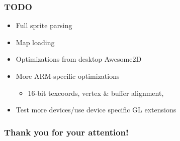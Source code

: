\documentclass[ignorenonframetext]{beamer}
\begin{document}
\begin{frame}[fragile]
\frametitle{TODO}

\begin{itemize}

\item Full sprite parsing

\item Map loading

\item Optimizations from desktop Awesome2D

\item More ARM-specific optimizations
\begin{itemize}

\item 16-bit texcoords, vertex \& buffer alignment,
\end{itemize}

\item Test more devices/use device specific GL extensions
\end{itemize}
\end{frame}

\begin{frame}[fragile]
\frametitle{Thank you for your attention!}

\end{frame}
\end{document}
